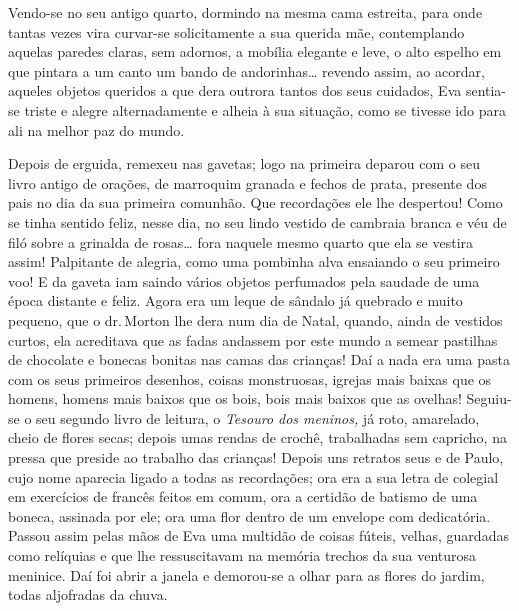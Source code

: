 {

Vendo-se no seu antigo quarto, dormindo na mesma cama estreita,
para onde tantas vezes vira curvar-se solicitamente a sua querida
mãe, contemplando aquelas paredes claras, sem adornos, a
mobília elegante e leve, o alto espelho em que pintara a um
canto um bando de andorinhas\ldots{} revendo assim, ao acordar, aqueles
objetos queridos a que dera outrora tantos dos seus cuidados,
Eva sentia-se triste e alegre alternadamente e alheia à sua
situação, como se tivesse ido para ali na melhor paz do mundo.

Depois de erguida, remexeu nas gavetas; logo na primeira deparou
com o seu livro antigo de orações, de marroquim granada e fechos de
prata, presente dos pais no dia da sua primeira comunhão. Que
recordações ele lhe despertou! Como se tinha sentido feliz, nesse dia,
no seu lindo vestido de cambraia branca e véu de filó sobre a grinalda
de rosas\ldots{} fora naquele mesmo quarto que ela se vestira
assim! Palpitante de alegria, como uma pombinha alva ensaiando o seu
primeiro voo! E da gaveta iam saindo vários
objetos perfumados pela saudade de uma época distante e feliz.
Agora era um leque de sândalo já quebrado e muito pequeno, que
o dr.\,Morton lhe dera num dia de Natal, quando, ainda de vestidos
curtos, ela acreditava que as fadas andassem por este mundo a semear
pastilhas de chocolate e bonecas bonitas nas camas das crianças! Daí a
nada era uma pasta com os seus primeiros desenhos, coisas monstruosas,
igrejas mais baixas que os homens, homens mais baixos que os
bois, bois mais baixos que as ovelhas! Seguiu-se o seu segundo livro de
leitura, o \emph{Tesouro dos meninos,} já roto, amarelado, cheio de
flores secas; depois umas rendas de crochê, trabalhadas sem
capricho, na pressa que preside ao trabalho das crianças! Depois uns
retratos seus e de Paulo, cujo nome aparecia ligado a todas as
recordações; ora era a sua letra de colegial em exercícios de francês
feitos em comum, ora a certidão de batismo de uma boneca, assinada por
ele; ora uma flor dentro de um envelope com dedicatória. Passou
assim pelas mãos de Eva uma multidão de coisas fúteis, velhas, guardadas
como relíquias e que lhe ressuscitavam na memória
trechos da sua venturosa meninice. Daí foi abrir a janela e demorou-se a
olhar para as flores do jardim, todas aljofradas da chuva.


}
